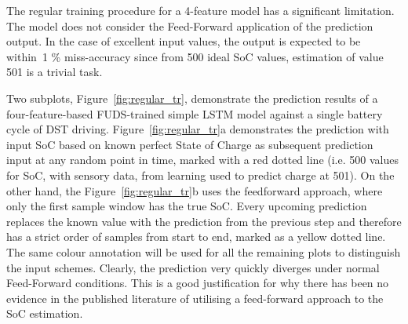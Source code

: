 The regular training procedure for a 4-feature model has a significant limitation. The model does not consider the Feed-Forward application of the prediction output.
In the case of excellent input values, the output is expected to be within~1 \% miss-accuracy since from 500 ideal SoC values, estimation of value 501 is a trivial task.

%
%
Two subplots, \mbox{Figure~\ref{fig:regular_tr}}, demonstrate the prediction results of a four-feature-based FUDS-trained simple LSTM model against a single battery cycle of DST driving.
\mbox{Figure~\ref{fig:regular_tr}a} demonstrates the prediction with input SoC based on known perfect State of Charge as subsequent prediction input at any random point in time, marked with a red dotted line (i.e. 500 values for SoC, with sensory data, from learning used to predict charge at 501).
On the other hand, the \mbox{Figure~\ref{fig:regular_tr}b} uses the feedforward approach, where only the first sample window has the true SoC.
Every upcoming prediction replaces the known value with the prediction from the previous step and therefore has a strict order of samples from start to end, marked as a yellow dotted line.
The same colour annotation will be used for all the remaining plots to distinguish the input schemes.
Clearly, the prediction very quickly diverges under normal Feed-Forward conditions.
This is a good justification for why there has been no evidence in the published literature of utilising a feed-forward approach to the SoC estimation.
